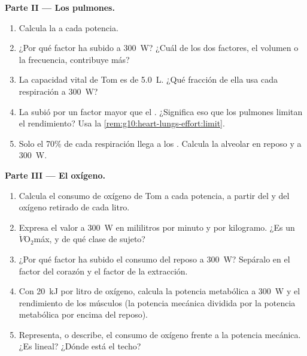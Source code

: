 \begin{problem}
\medskip
\noindent\textbf{Parte II --- Los pulmones.}
\begin{enumerate}[resume]
  \item Calcula la  a cada potencia.
  \item ¿Por qué factor ha subido a \qty{300}{W}? ¿Cuál de los dos
        factores, el volumen o la frecuencia, contribuye más?
  \item La capacidad vital de Tom es de \qty{5.0}{L}. ¿Qué fracción de
        ella usa cada respiración a \qty{300}{W}?
  \item La  subió por un factor mayor que el . ¿Significa eso que los pulmones limitan el
        rendimiento? Usa la \cref{rem:g10:heart-lungs-effort:limit}.
  \item Solo el 70\% de cada respiración llega a los . Calcula
        la  alveolar en reposo y a \qty{300}{W}.
\end{enumerate}

\medskip
\noindent\textbf{Parte III --- El oxígeno.}
\begin{enumerate}[resume]
  \item Calcula el consumo de oxígeno de Tom a cada potencia, a partir
        del  y del oxígeno retirado de cada litro.
  \item Expresa el valor a \qty{300}{W} en mililitros por minuto y por
        kilogramo. ¿Es un $\dot V\!\mathrm{O_2}$máx, y de qué clase de
        sujeto?
  \item ¿Por qué factor ha subido el consumo del reposo a
        \qty{300}{W}? Sepáralo en el factor del corazón y el factor de
        la extracción.
  \item Con \qty{20}{kJ} por litro de oxígeno, calcula la potencia
        metabólica a \qty{300}{W} y el rendimiento de los músculos (la
        potencia mecánica dividida por la potencia metabólica por
        encima del reposo).
  \item Representa, o describe, el consumo de oxígeno frente a la
        potencia mecánica. ¿Es lineal? ¿Dónde está el techo?
\end{enumerate}


\end{problem}
